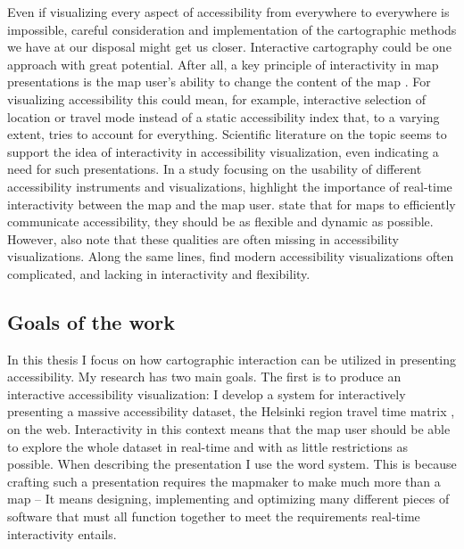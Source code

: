 Even if visualizing every aspect of accessibility
from everywhere to everywhere is impossible,
careful consideration and implementation
of the cartographic methods we have at our disposal might get us closer.
Interactive cartography could be one approach with great potential.
After all, a key principle of interactivity in map presentations is
the map user's ability to change the content of the map \parencite{rot2013b}.
For visualizing accessibility this could mean, for example,
interactive selection of location or travel mode instead of
a static accessibility index that, to a varying extent,
tries to account for everything.
Scientific literature on the topic seems to support the idea of
interactivity in accessibility visualization,
even indicating a need for such presentations.
In a study focusing on the usability of
different accessibility instruments and visualizations,  %
\textcite{te2014} highlight the importance of
real-time interactivity between the map and the map user.
\textcite{but2018} state that for maps to efficiently communicate accessibility,
they should be as flexible and dynamic as possible.
However, \textcite{but2018} also note that
these qualities are often missing in accessibility visualizations.
Along the same lines, \textcite{paj2021} find modern accessibility visualizations often complicated,
and lacking in interactivity and flexibility.


\subsection{Goals of the work}

In this thesis I focus on
how cartographic interaction can be utilized in presenting accessibility.
My research has two main goals.
The first is to produce an interactive accessibility visualization: %
I develop a system for interactively presenting a massive accessibility dataset,
the Helsinki region travel time matrix \parencite{fin2023},
on the web.  %
Interactivity in this context means that
the map user should be able to
explore the whole dataset in real-time
and with as little restrictions as possible.
When describing the presentation I use the word system.
This is because crafting such a presentation
requires the mapmaker to make much more than a map --
It means designing, implementing and optimizing
many different pieces of software that must all function together
to meet the requirements real-time interactivity entails.

